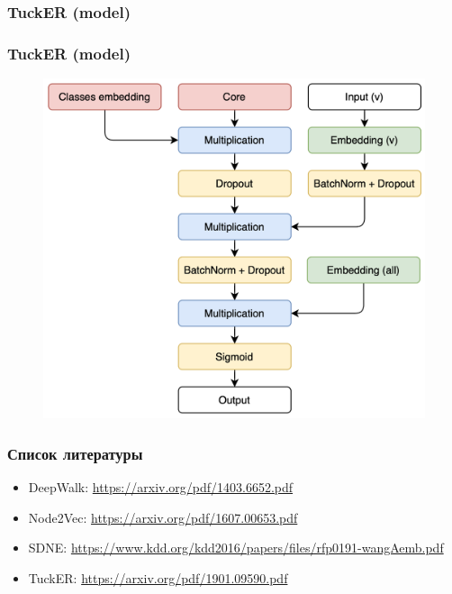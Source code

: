 \documentclass{beamer}
\begin{document}
\begin{frame}
    \frametitle{TuckER (model)}
\end{frame}

\begin{frame}
    \frametitle{TuckER (model)}
    \begin{figure}
        \includegraphics[width=0.7\columnwidth]{Diagram.png}
    \end{figure}
\end{frame}

\begin{frame}
\frametitle{Список литературы}
\begin{itemize}
    \item DeepWalk: \url{https://arxiv.org/pdf/1403.6652.pdf}
    \item Node2Vec: \url{https://arxiv.org/pdf/1607.00653.pdf}
    \item SDNE: \url{https://www.kdd.org/kdd2016/papers/files/rfp0191-wangAemb.pdf}
    \item TuckER: \url{https://arxiv.org/pdf/1901.09590.pdf}
\end{itemize}
\end{frame}
\end{document}
